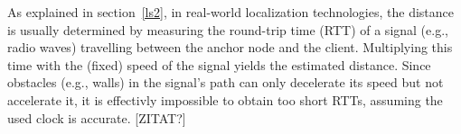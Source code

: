 As explained in section~\ref{ls2}, in real-world localization technologies, the distance is usually determined by measuring the round-trip time (RTT) of a signal (e.g., radio waves) travelling between the anchor node and the client. Multiplying this time with the (fixed) speed of the signal yields the estimated distance. Since obstacles (e.g., walls) in the signal's path can only decelerate its speed but not accelerate it, it is effectivly impossible to obtain too short RTTs, assuming the used clock is accurate. [ZITAT?]